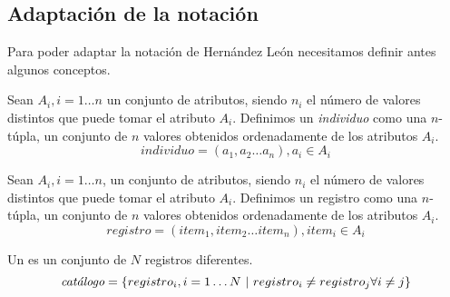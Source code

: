 








\subsection{Adaptación de la notación}
\label{sec:clasificacion:conceptos-basicos:tal}
%
Para poder adaptar la notación de Hernández León necesitamos definir antes algunos conceptos.

\begin{Definition}[Individuo]
   Sean $A_i, i = 1 \ldots n$ un conjunto de atributos, siendo $n_i$ el número de valores distintos que puede tomar el atributo $A_i$. Definimos un \emph{individuo} como una $n$-túpla, un conjunto de $n$ valores obtenidos ordenadamente de los atributos $A_i$.
   $$individuo = \left(a_1, a_2\ldots a_n\right), a_i \in A_i$$
\label{def:individuo}
\end{Definition}


\begin{Definition}[Registro]
   Sean $A_i, i = 1 \ldots n$, un conjunto de atributos, siendo $n_i$ el número de valores distintos que puede tomar el atributo $A_i$. Definimos un registro como una $n$-túpla, un conjunto de $n$ valores obtenidos ordenadamente de los atributos $A_i$.
   $$registro = \left(item_1, item_2\ldots item_n\right), item_i \in A_i$$
\label{def:registro}
\end{Definition}

\begin{Definition}[\Catalogo] Un \catalogo es un conjunto de $N$ registros diferentes.
   $$\catalogo = \left\{registro_i, i = 1\ldots N\ | \ registro_i \neq registro_j \forall i \neq j\right\}$$
\label{def:catalogo}
\end{Definition}
